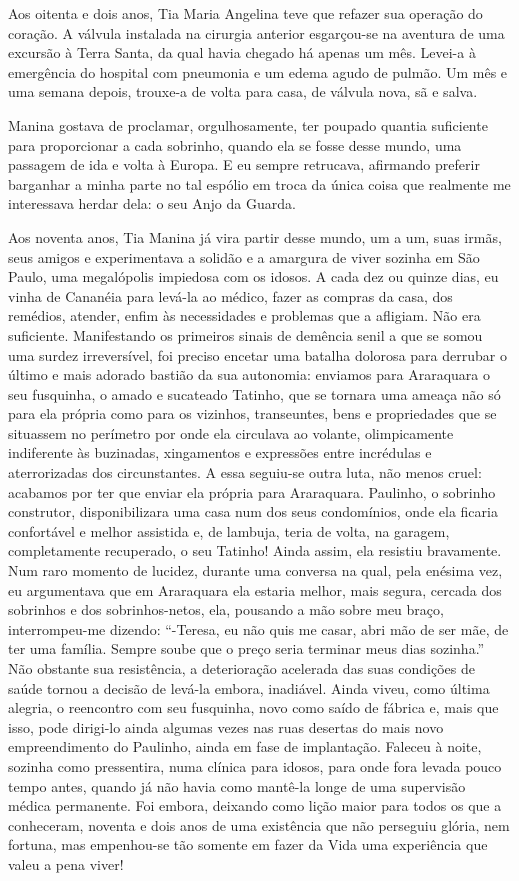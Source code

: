 Aos oitenta e dois anos, Tia Maria Angelina teve que refazer sua operação do coração.
A válvula instalada na cirurgia anterior esgarçou-se na aventura de uma excursão à Terra Santa, da qual havia chegado há apenas um mês.
Levei-a à emergência do hospital com pneumonia e um edema agudo de pulmão.
Um mês e uma semana depois, trouxe-a de volta para casa, de válvula nova, sã e salva.

Manina gostava de proclamar, orgulhosamente, ter poupado quantia suficiente para proporcionar a cada sobrinho, quando ela se fosse desse mundo, uma passagem de ida e volta à Europa.
E eu sempre retrucava, afirmando preferir barganhar a minha parte no tal espólio em troca da única coisa que realmente me interessava herdar dela: o seu Anjo da Guarda.

Aos noventa anos, Tia Manina já vira partir desse mundo, um a um, suas irmãs, seus amigos e experimentava a solidão e a amargura de viver sozinha em São Paulo, uma megalópolis impiedosa com os idosos.
A cada dez ou quinze dias, eu vinha de Cananéia para levá-la ao médico, fazer as compras da casa, dos remédios, atender, enfim às necessidades e problemas que a afligiam.
Não era suficiente.
Manifestando os primeiros sinais de demência senil a que se somou uma surdez irreversível, foi preciso encetar uma batalha dolorosa para derrubar o último e mais adorado bastião da sua autonomia: enviamos para Araraquara o seu fusquinha, o amado e sucateado Tatinho, que se tornara uma ameaça não só para ela própria  como para os vizinhos, transeuntes, bens e propriedades que se situassem no perímetro por onde ela circulava ao volante, olimpicamente  indiferente às buzinadas, xingamentos e expressões entre incrédulas e aterrorizadas dos circunstantes.
A essa seguiu-se outra luta, não menos cruel: acabamos por ter que enviar ela própria para Araraquara.
Paulinho, o sobrinho construtor, disponibilizara uma casa num dos seus condomínios, onde ela ficaria confortável e melhor assistida e, de lambuja, teria de volta, na garagem, completamente recuperado, o seu Tatinho!
Ainda assim, ela resistiu bravamente.
Num raro momento de lucidez, durante uma conversa na qual, pela enésima vez, eu argumentava que em Araraquara ela estaria melhor, mais segura, cercada dos sobrinhos e dos sobrinhos-netos, ela, pousando a mão sobre meu braço, interrompeu-me dizendo:
“-Teresa, eu não quis me casar, abri mão de ser mãe, de ter uma família.
Sempre soube que o preço seria terminar meus dias sozinha.”
Não obstante sua resistência, a deterioração acelerada das suas condições de saúde tornou a decisão de levá-la embora, inadiável.
Ainda viveu, como última alegria, o reencontro com seu fusquinha, novo como saído de fábrica e, mais que isso, pode dirigi-lo ainda algumas vezes nas ruas desertas do mais novo empreendimento do Paulinho, ainda em fase de implantação.
Faleceu à noite, sozinha como pressentira, numa clínica para idosos, para onde fora levada pouco tempo antes, quando já não havia como mantê-la longe de uma supervisão médica permanente.
Foi embora, deixando como lição maior para todos os que a conheceram, noventa e dois anos de uma existência que não perseguiu glória, nem fortuna, mas empenhou-se tão somente em fazer da Vida uma experiência que valeu a pena viver! 
